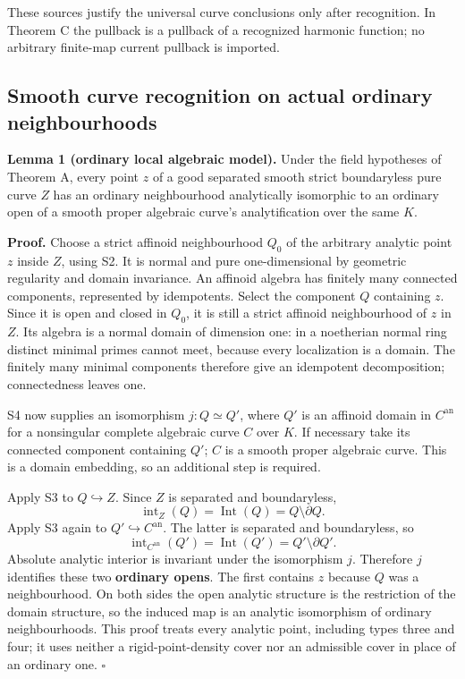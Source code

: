 \documentclass[
  11pt,
]{article}
\begin{document}
These sources justify the universal curve conclusions only after
recognition. In Theorem C the pullback is a pullback of a recognized
harmonic function; no arbitrary finite-map current pullback is imported.

\subsection{Smooth curve recognition on actual ordinary
neighbourhoods}\label{smooth-curve-recognition-on-actual-ordinary-neighbourhoods}

\textbf{Lemma 1 (ordinary local algebraic model).} Under the field
hypotheses of Theorem A, every point \(z\) of a good separated smooth
strict boundaryless pure curve \(Z\) has an ordinary neighbourhood
analytically isomorphic to an ordinary open of a smooth proper algebraic
curve's analytification over the same \(K\).

\textbf{Proof.} Choose a strict affinoid neighbourhood \(Q_0\) of the
arbitrary analytic point \(z\) inside \(Z\), using S2. It is normal and
pure one-dimensional by geometric regularity and domain invariance. An
affinoid algebra has finitely many connected components, represented by
idempotents. Select the component \(Q\) containing \(z\). Since it is
open and closed in \(Q_0\), it is still a strict affinoid neighbourhood
of \(z\) in \(Z\). Its algebra is a normal domain of dimension one: in a
noetherian normal ring distinct minimal primes cannot meet, because
every localization is a domain. The finitely many minimal components
therefore give an idempotent decomposition; connectedness leaves one.

S4 now supplies an isomorphism \(j:Q\simeq Q'\), where \(Q'\) is an
affinoid domain in \(C^{\mathrm{an}}\) for a nonsingular complete
algebraic curve \(C\) over \(K\). If necessary take its connected
component containing \(Q'\); \(C\) is a smooth proper algebraic curve.
This is a domain embedding, so an additional step is required.

Apply S3 to \(Q\hookrightarrow Z\). Since \(Z\) is separated and
boundaryless, \[
      \operatorname{int}_Z(Q)=\operatorname{Int}(Q)=Q\setminus\partial Q.
\] Apply S3 again to \(Q'\hookrightarrow C^{\mathrm{an}}\). The latter
is separated and boundaryless, so \[
      \operatorname{int}_{C^{\mathrm{an}}}(Q')
             =\operatorname{Int}(Q')=Q'\setminus\partial Q'.
\] Absolute analytic interior is invariant under the isomorphism \(j\).
Therefore \(j\) identifies these two \textbf{ordinary opens}. The first
contains \(z\) because \(Q\) was a neighbourhood. On both sides the open
analytic structure is the restriction of the domain structure, so the
induced map is an analytic isomorphism of ordinary neighbourhoods. This
proof treats every analytic point, including types three and four; it
uses neither a rigid-point-density cover nor an admissible cover in
place of an ordinary one. \(\square\)
\end{document}
